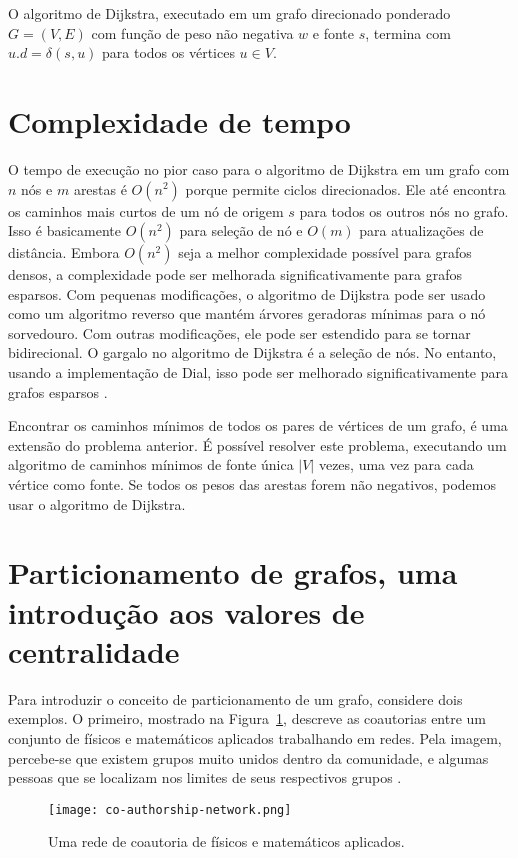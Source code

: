 \begin{definition}
	O algoritmo de Dijkstra, executado em um grafo direcionado ponderado $G = (V, E)$ com função de peso não negativa $w$ e fonte $s$, termina com $u.d = \delta(s, u)$ para todos os vértices $u \in V$.
\end{definition}


\section{Complexidade de tempo}
O tempo de execução no pior caso para o algoritmo de Dijkstra em um grafo com $n$ nós e $m$ arestas é $O(n^2)$ porque permite ciclos direcionados. Ele até encontra os caminhos mais curtos de um nó de origem $s$ para todos os outros nós no grafo. Isso é basicamente $O(n^2)$ para seleção de nó e $O(m)$ para atualizações de distância. Embora $O(n^2)$ seja a melhor complexidade possível para grafos densos, a complexidade pode ser melhorada significativamente para grafos esparsos. Com pequenas modificações, o algoritmo de Dijkstra pode ser usado como um algoritmo reverso que mantém árvores geradoras mínimas para o nó sorvedouro. Com outras modificações, ele pode ser estendido para se tornar bidirecional. O gargalo no algoritmo de Dijkstra é a seleção de nós. No entanto, usando a implementação de Dial, isso pode ser melhorado significativamente para grafos esparsos \cite{len2021}.

Encontrar os caminhos mínimos de todos os pares de vértices de um grafo, é uma extensão do problema anterior. É possível resolver este problema, executando um algoritmo de caminhos mínimos de fonte única $\left\lvert V\right\rvert$ vezes, uma vez para cada vértice como fonte. Se todos os pesos das arestas forem não negativos, podemos usar o algoritmo de Dijkstra.


\section{Particionamento de grafos, uma introdução aos valores de centralidade}
Para introduzir o conceito de particionamento de um grafo, considere dois exemplos. O primeiro, mostrado na Figura~\ref{sec3:co-authorship-network}, descreve as coautorias entre um conjunto de físicos e matemáticos aplicados trabalhando em redes. Pela imagem, percebe-se que existem grupos muito unidos dentro da comunidade, e algumas pessoas que se localizam nos limites de seus respectivos grupos \cite{easley2010}.

\begin{figure}[!htb]
    \centering
    \texttt{[image: co-authorship-network.png]}
    \caption{Uma rede de coautoria de físicos e matemáticos aplicados.}
    \label{sec3:co-authorship-network}
\end{figure}

